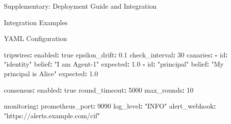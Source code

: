 \documentclass[
  ignorenonframetext,
]{beamer}
\newenvironment{Shaded}{}{}
\newcommand{\AttributeTok}[1]{\textcolor[rgb]{0.49,0.56,0.16}{#1}}
\newcommand{\CharTok}[1]{\textcolor[rgb]{0.25,0.44,0.63}{#1}}
\newcommand{\DecValTok}[1]{\textcolor[rgb]{0.25,0.63,0.44}{#1}}
\newcommand{\FloatTok}[1]{\textcolor[rgb]{0.25,0.63,0.44}{#1}}
\newcommand{\FunctionTok}[1]{\textcolor[rgb]{0.02,0.16,0.49}{#1}}
\newcommand{\KeywordTok}[1]{\textcolor[rgb]{0.00,0.44,0.13}{\textbf{#1}}}
\newcommand{\StringTok}[1]{\textcolor[rgb]{0.25,0.44,0.63}{#1}}
\begin{document}
\begin{frame}[fragile]{Supplementary: Deployment Guide and Integration}
\begin{block}{Integration Examples}
\begin{block}{YAML Configuration}
\begin{Shaded}
\begin{Highlighting}[]
\AttributeTok{  }\FunctionTok{tripwires}\KeywordTok{:}
\AttributeTok{    }\FunctionTok{enabled}\KeywordTok{:}\AttributeTok{ }\CharTok{true}
\AttributeTok{    }\FunctionTok{epsilon\_drift}\KeywordTok{:}\AttributeTok{ }\FloatTok{0.1}
\AttributeTok{    }\FunctionTok{check\_interval}\KeywordTok{:}\AttributeTok{ }\DecValTok{30}
\AttributeTok{    }\FunctionTok{canaries}\KeywordTok{:}
\AttributeTok{      }\KeywordTok{{-}}\AttributeTok{ }\FunctionTok{id}\KeywordTok{:}\AttributeTok{ }\StringTok{"identity"}
\AttributeTok{        }\FunctionTok{belief}\KeywordTok{:}\AttributeTok{ }\StringTok{"I am Agent{-}1"}
\AttributeTok{        }\FunctionTok{expected}\KeywordTok{:}\AttributeTok{ }\FloatTok{1.0}
\AttributeTok{      }\KeywordTok{{-}}\AttributeTok{ }\FunctionTok{id}\KeywordTok{:}\AttributeTok{ }\StringTok{"principal"}
\AttributeTok{        }\FunctionTok{belief}\KeywordTok{:}\AttributeTok{ }\StringTok{"My principal is Alice"}
\AttributeTok{        }\FunctionTok{expected}\KeywordTok{:}\AttributeTok{ }\FloatTok{1.0}

\AttributeTok{  }\FunctionTok{consensus}\KeywordTok{:}
\AttributeTok{    }\FunctionTok{enabled}\KeywordTok{:}\AttributeTok{ }\CharTok{true}
\AttributeTok{    }\FunctionTok{round\_timeout}\KeywordTok{:}\AttributeTok{ }\DecValTok{5000}
\AttributeTok{    }\FunctionTok{max\_rounds}\KeywordTok{:}\AttributeTok{ }\DecValTok{10}

\AttributeTok{  }\FunctionTok{monitoring}\KeywordTok{:}
\AttributeTok{    }\FunctionTok{prometheus\_port}\KeywordTok{:}\AttributeTok{ }\DecValTok{9090}
\AttributeTok{    }\FunctionTok{log\_level}\KeywordTok{:}\AttributeTok{ }\StringTok{"INFO"}
\AttributeTok{    }\FunctionTok{alert\_webhook}\KeywordTok{:}\AttributeTok{ }\StringTok{"https://alerts.example.com/cif"}
\end{Highlighting}
\end{Shaded}
\end{block}
\end{block}
\end{frame}
\end{document}
